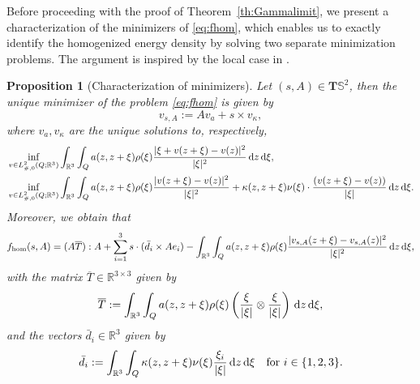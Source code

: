 \documentclass[reqno,11pt]{amsart}
\numberwithin{equation}{section}
\theoremstyle{thmlemcorr}
\numberwithin{theorem}{section}
\newtheorem{proposition}[theorem]{Proposition}
\theoremstyle{thmlemcorr*}
\theoremstyle{defi}
\theoremstyle{remexample}
\theoremstyle{ass}
\newcommand{\R}{\mathbb{R}}
\renewcommand{\S}{\mathbb{S}}
\newcommand{\dd}{\,\mathrm{d}}
\DeclarePairedDelimiter{\abs}{\lvert}{\rvert}
\newcommand{\1}{\mathds{1}}
\newcommand{\hidde}[1]{{\textcolor{orange}{$\langle\hspace{-0.3ex}\langle$Hidde: #1$\rangle\hspace{-0.3ex}\rangle$}}}
\begin{document}
Before proceeding with the proof of Theorem~\ref{th:Gammalimit}, we present a characterization of the minimizers of \eqref{eq:fhom}, which enables us to exactly identify the homogenized energy density by  solving two separate minimization problems. The argument is inspired by the local case in \cite[Proposition~2.1]{DaD20}. %
\begin{proposition}[Characterization of minimizers]\label{prop:min_fhom}
    Let $(s,A) \in \mathbf{T}\S^2$, then the unique minimizer of the problem \eqref{eq:fhom} is given by
    \begin{equation}\label{eq:vsaformula}
    v_{s,A}:=Av_a+ s \times v_\kappa,
    \end{equation}
    where $v_a,v_\kappa$ are the unique solutions to, respectively,
    \begin{align*}
    &\inf_{v \in L^2_{\#,0}(Q;\R^3)}\int_{\R^3}\int_{Q}a(z,z+\xi)\rho(\xi)\frac{|\xi +v(z+\xi)-v(z)|^2}{|\xi|^2}\dd z\dd \xi,\\
    &\inf_{v \in L^2_{\#,0}(Q;\R^3)}\int_{\R^3}\int_{Q}a(z,z+\xi)\rho(\xi)\frac{|v(z+\xi)-v(z)|^2}{|\xi|^2}+\kappa(z,z+\xi)\nu(\xi)\cdot \frac{(v(z+\xi)-v(z))}{\abs{\xi}} \dd z\dd \xi.
    \end{align*}
    Moreover, we obtain that
    \[
    f_{\rm hom}(s,A) = (A\overline{T}):A+\sum_{i=1}^{3}s\cdot(\bar{d}_i\times Ae_i)-\int_{\R^3}\int_{Q}a(z,z+\xi)\rho(\xi)\frac{\abs{v_{s,A}(z+\xi)-v_{s,A}(z)}^2}{\abs{\xi}^2}\dd z\dd \xi, 
    \]
    with the matrix $\overline{T} \in \R^{3\times3}$ given by 
    \begin{equation}\label{eq:tensorT}
    \overline{T}:=\int_{\R^3}\int_{Q}a(z,z+\xi)\rho(\xi)\left(\frac{\xi}{\abs{\xi}} \otimes \frac{\xi}{\abs{\xi}}\right)\dd z\dd \xi,
    \end{equation}
    and the vectors $\bar{d}_i \in \R^3$ given by 
    \begin{equation}\label{eq:dmivectors}
    \bar{d}_i:=\int_{\R^3}\int_{Q} \kappa(z,z+\xi)\nu(\xi)\frac{\xi_i}{\abs{\xi}}\dd z\dd \xi \quad \text{for $i\in \{1,2,3\}$.}
    \end{equation}
\end{proposition}
\end{document}

